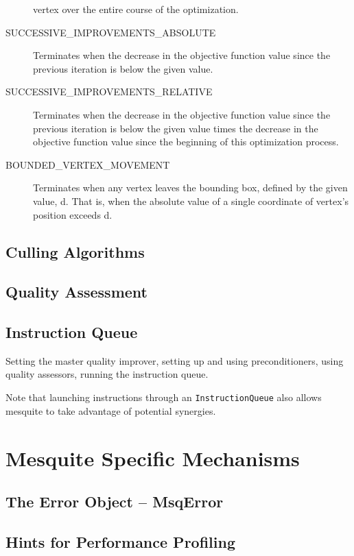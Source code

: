 \documentclass[letter]{report}
\begin{document}
\begin{description}
vertex over the entire course of the optimization. 
\item[SUCCESSIVE\_\-IMPROVEMENTS\_\-ABSOLUTE] Terminates when the decrease in the objective function
value since the previous iteration is below the given value.
\item[SUCCESSIVE\_\-IMPROVEMENTS\_\-RELATIVE] Terminates when the decrease in the objective function
value since the previous iteration is below the given value times the decrease in the objective
function value since the beginning of this optimization process. 
\item[BOUNDED\_\-VERTEX\_\-MOVEMENT] Terminates when any vertex leaves the bounding box, defined by the given value, d. That is, when
the absolute value of a single coordinate of vertex's position exceeds d. 
\end{description}


\subsection{Culling Algorithms}

\subsection{Quality Assessment}

\subsection{Instruction Queue}
Setting the master quality improver, setting up and using preconditioners,
using quality assessors, running the instruction queue.

Note that launching instructions through an \texttt{InstructionQueue} also allows mesquite to take
advantage of potential synergies. 


\section{Mesquite Specific Mechanisms}

\subsection{The Error Object -- MsqError}
\label{sec:MsqError}

\subsection{Hints for Performance Profiling}
\end{document}
